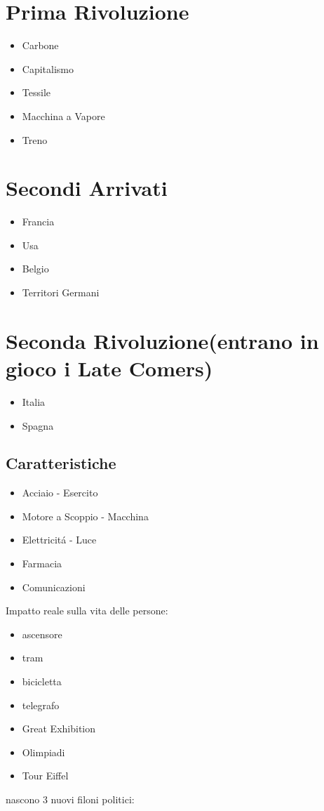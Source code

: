 \documentclass{article}
\title{\jobname}
\author{Eugenio Animali}
\begin{document}
\maketitle
\section{Prima Rivoluzione}
\begin{itemize}
\item Carbone
\item Capitalismo
\item Tessile
\item Macchina a Vapore
\item Treno
\end{itemize}
\section{Secondi Arrivati}
\begin{itemize}
\item Francia
\item Usa
\item Belgio
\item Territori Germani
\end{itemize}
\section{Seconda Rivoluzione(entrano in gioco i Late Comers)}
\begin{itemize}
\item Italia
\item Spagna
\end{itemize}
\subsection{Caratteristiche}
\begin{itemize}
\item Acciaio - Esercito
\item Motore a Scoppio - Macchina
\item Elettricitá - Luce
\item Farmacia
\item Comunicazioni
\end{itemize}
Impatto reale sulla vita delle persone:
\begin{itemize}
\item ascensore
\item tram
\item bicicletta
\item telegrafo
\item Great Exhibition
\item Olimpiadi
\item Tour Eiffel
\end{itemize}
nascono 3 nuovi filoni politici:
\end{document}
